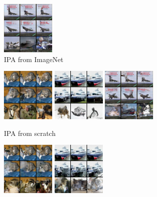 \begin{figure}[t]
\begin{subfigure}[t]{0.17\textwidth}
      \includegraphics[height=\cifarimgheight]{figs/cigcvae/image-samples/cifar10/freeform_aipo_3_imagenet_samples}
      \caption{\scriptsize IPA from ImageNet}
    \end{subfigure}
    \begin{subfigure}[t]{0.17\textwidth}
      \centering
      \includegraphics[height=\cifarimgheight]{figs/cigcvae/image-samples/cifar10/freeform_aipo_0_scratch_samples}
      \includegraphics[height=\cifarimgheight]{figs/cigcvae/image-samples/cifar10/freeform_aipo_1_scratch_samples}
      \includegraphics[height=\cifarimgheight]{figs/cigcvae/image-samples/cifar10/freeform_aipo_3_scratch_samples}
      \caption{\scriptsize IPA from scratch}
    \end{subfigure}
    \begin{subfigure}[t]{0.17\textwidth}
      \centering
      \includegraphics[height=\cifarimgheight]{figs/cigcvae/image-samples/cifar10/freeform_aipo-r_0_samples}
      \includegraphics[height=\cifarimgheight]{figs/cigcvae/image-samples/cifar10/freeform_aipo-r_1_samples}

\end{subfigure}
\end{figure}

